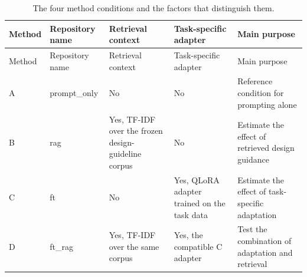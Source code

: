 \begin{landscape}
\begingroup\scriptsize\setlength{\tabcolsep}{3pt}\sloppy
\begin{longtable}[]{@{}
  >{\raggedright\arraybackslash}p{}
  >{\raggedright\arraybackslash}p{}
  >{\raggedright\arraybackslash}p{}
  >{\raggedright\arraybackslash}p{}
  >{\raggedright\arraybackslash}p{}@{}}
\caption{The four method conditions and the factors that distinguish them.}\tabularnewline
\toprule\noalign{}
\begin{minipage}[b]{\linewidth}\raggedright
Method
\end{minipage} & \begin{minipage}[b]{\linewidth}\raggedright
Repository name
\end{minipage} & \begin{minipage}[b]{\linewidth}\raggedright
Retrieval context
\end{minipage} & \begin{minipage}[b]{\linewidth}\raggedright
Task-specific adapter
\end{minipage} & \begin{minipage}[b]{\linewidth}\raggedright
Main purpose
\end{minipage} \\
\midrule\noalign{}
\endfirsthead
\toprule\noalign{}
\begin{minipage}[b]{\linewidth}\raggedright
Method
\end{minipage} & \begin{minipage}[b]{\linewidth}\raggedright
Repository name
\end{minipage} & \begin{minipage}[b]{\linewidth}\raggedright
Retrieval context
\end{minipage} & \begin{minipage}[b]{\linewidth}\raggedright
Task-specific adapter
\end{minipage} & \begin{minipage}[b]{\linewidth}\raggedright
Main purpose
\end{minipage} \\
\midrule\noalign{}
\endhead
\bottomrule\noalign{}
\endlastfoot
A & prompt\_only & No & No & Reference condition for prompting alone \\
B & rag & Yes, TF-IDF over the frozen design-guideline corpus & No & Estimate the effect of retrieved design guidance \\
C & ft & No & Yes, QLoRA adapter trained on the task data & Estimate the effect of task-specific adaptation \\
D & ft\_rag & Yes, TF-IDF over the same corpus & Yes, the compatible C adapter & Test the combination of adaptation and retrieval \\
\end{longtable}
\endgroup
\end{landscape}

